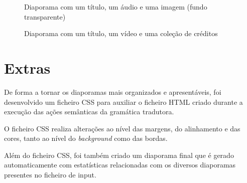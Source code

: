 \documentclass[11pt,a4paper]{report}
\begin{document}
\begin{figure}[H]
\centering
{}
\caption{Diaporama com um título, um áudio e uma imagem (fundo transparente)}
\label{img:exemplo5}
\end{figure}

\begin{figure}[H]
\centering
{}
\caption{Diaporama com um título, um vídeo e uma coleção de créditos}
\label{img:exemplo7}
\end{figure}


\chapter{Extras}
\label{chap:extras}

De forma a tornar os diaporamas mais organizados e apresentáveis, foi desenvolvido um ficheiro CSS para auxiliar o ficheiro HTML criado durante a execução das ações semânticas da gramática tradutora.

O ficheiro CSS realiza alterações ao nível das margens, do alinhamento e das cores, tanto ao nível do \textit{background} como das bordas.

Além do ficheiro CSS, foi também criado um diaporama final que é gerado automaticamente com estatísticas relacionadas com os diversos diaporamas presentes no ficheiro de input.
\end{document}
